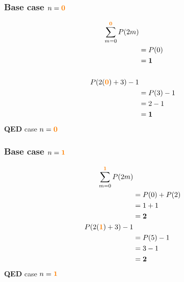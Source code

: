 \documentclass[11pt]{article}
\def \subsorange [#1]{\mathbf{\textcolor{orange}{#1}}}
\begin{document}
\begin{table}[h]
   \begin{subtable}[t]{0.45\textwidth}
      \subsubsection*{Base case $n=\subsorange[0]$}
      \begin{alignat*}{2}
         \sum_{m=0}^{\subsorange[0]}P(2m)& \\
            &=P(0) \\
            &=\mathbf{1} \\
            &\phantom{=2} \\
         P(2(\subsorange[0])+3)-1& \\
            &=P(3)-1 \\
            &=2-1 \\
            &=\mathbf{1} \\
      \end{alignat*}
      \textbf{QED} case $n=\subsorange[0]$
   \end{subtable}
   \hfill
   \vline
   \hfill
   \begin{subtable}[t]{0.45\textwidth}
      \subsubsection*{Base case $n=\subsorange[1]$}
      \begin{alignat*}{2}
         \sum_{m=0}^{\subsorange[1]}P(2m)& \\
            &=P(0)+P(2) \\
            &=1+1 \\
            &=\mathbf{2} \\
         P(2(\subsorange[1])+3)-1& \\
            &=P(5)-1 \\
            &=3-1 \\
            &=\mathbf{2} \\
      \end{alignat*}
      \textbf{QED} case $n=\subsorange[1]$
   \end{subtable}
\end{table}
\end{document}
